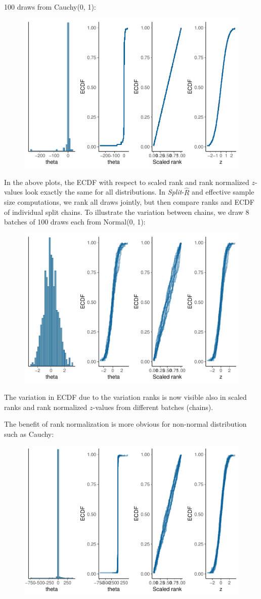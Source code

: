 \documentclass[american,]{article}
\begin{document}
100 draws from Cauchy(0, 1):

\begin{figure}[tp]
  \centering
  \includegraphics[width=0.6\linewidth]{graphics/ranknorm-cauchy-1.pdf}
\end{figure}

In the above plots, the ECDF with respect to scaled rank and rank
normalized \(z\)-values look exactly the same for all distributions. In
\emph{Split}-\(\widehat{R}\) and effective sample size computations, we
rank all draws jointly, but then compare ranks and ECDF of individual
split chains. To illustrate the variation between chains, we draw 8
batches of 100 draws each from Normal(0, 1):

\begin{figure}[tp]
  \centering
  \includegraphics[width=0.6\linewidth]{graphics/ranknorm-normal2-1.pdf}
\end{figure}

The variation in ECDF due to the variation ranks is now visible also in
scaled ranks and rank normalized \(z\)-values from different batches
(chains).

The benefit of rank normalization is more obvious for non-normal
distribution such as Cauchy:

\begin{figure}[tp]
  \centering
  \includegraphics[width=0.6\linewidth]{graphics/ranknorm-cauchy2-1.pdf}
\end{figure}
\end{document}
